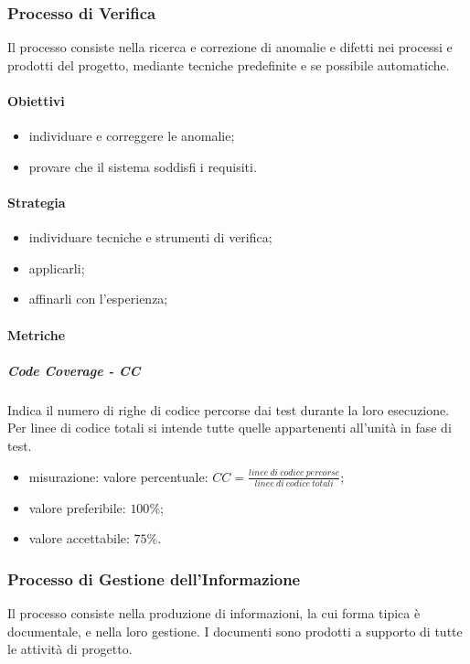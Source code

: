 	\subsubsection{Processo di Verifica}
	Il processo consiste nella ricerca e correzione di anomalie e difetti nei processi e prodotti del progetto, mediante tecniche predefinite e se possibile automatiche.
		\paragraph{Obiettivi}
		\begin{itemize}
			\item individuare e correggere le anomalie;
			\item provare che il sistema soddisfi i requisiti.
		\end{itemize}	
		\paragraph{Strategia}
		\begin{itemize}
			\item individuare tecniche e strumenti di verifica;
			\item applicarli;
			\item affinarli con l'esperienza;
		\end{itemize}	
		\paragraph{Metriche}
			\subparagraph{Code Coverage - CC}
				Indica il numero di righe di codice percorse dai test durante la loro esecuzione. Per linee di codice totali si intende tutte quelle appartenenti all'unità in fase di test.
				\begin{itemize}
					\item misurazione: valore percentuale: $CC = \frac{linee\ di\ codice\ percorse}{linee\ di\ codice\ totali}$;
					\item valore preferibile: $100\%$;
					\item valore accettabile: $75\%$.
				\end{itemize}

	\subsubsection{Processo di Gestione dell'Informazione}
	Il processo consiste nella produzione di informazioni, la cui forma tipica è  documentale, e nella loro gestione. I documenti sono prodotti a supporto di tutte le attività di progetto.
